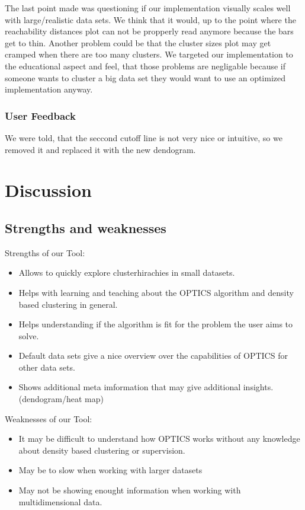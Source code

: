 \documentclass{vgtc}                          %
\begin{document}
The last point made was questioning if our implementation visually scales well with large/realistic data sets. We think that it would, up to the point where the reachability distances plot can not be propperly read anymore because the bars get to thin. Another problem could be that the cluster sizes plot may get cramped when there are too many clusters. We targeted our implementation to the educational aspect and feel, that those problems are negligable because if someone wants to cluster a big data set they would want to use an optimized implementation anyway.

\subsubsection{User Feedback}
We were told, that the seccond cutoff line is not very nice or intuitive, so we removed it and replaced it with the new dendogram.

\section{Discussion}

\subsection{Strengths and weaknesses}
Strengths of our Tool:
\begin{itemize}
\item Allows to quickly explore clusterhirachies in small datasets.
\item Helps with learning and teaching about the OPTICS algorithm and density based clustering in general.
\item Helps understanding if the algorithm is fit for the problem the user aims to solve.
\item Default data sets give a nice overview over the capabilities of OPTICS for other data sets.
\item Shows additional meta imformation that may give additional insights. (dendogram/heat map)
\end{itemize}
Weaknesses of our Tool:
\begin{itemize}
\item It may be difficult to understand how OPTICS works without any knowledge about density based clustering or supervision.
\item May be to slow when working with larger datasets
\item May not be showing enought information when working with multidimensional data.
\end{itemize}
\end{document}
